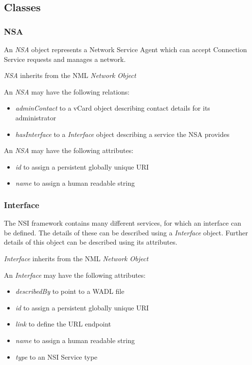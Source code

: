 \documentclass[12pt]{article}  %
\begin{document}
\subsection{Classes}%
\label{sub:classes}

\subsubsection{NSA}%
\label{class:nsa}

An \emph{NSA} object represents a Network Service Agent which can accept Connection Service requests and manages a network.

\emph{NSA} inherits from the NML \emph{Network Object}

An \emph{NSA} may have the following relations:
\begin{itemize}
  \item \emph{adminContact} to a vCard object describing contact details for its administrator
  \item \emph{hasInterface} to a \emph{Interface} object describing a service the NSA provides
\end{itemize}

An \emph{NSA} may have the following attributes:
\begin{itemize}
  \item \emph{id} to assign a persistent globally unique URI
  \item \emph{name} to assign a human readable string  
\end{itemize}

\subsubsection{Interface}%
\label{class:Interface}

The NSI framework contains many different services, for which an interface can be defined. The details of these can be described using a \emph{Interface} object. Further details of this object can be described using its attributes.

\emph{Interface} inherits from the NML \emph{Network Object}

An \emph{Interface} may have the following attributes:
\begin{itemize}
  \item \emph{describedBy} to point to a WADL file
  \item \emph{id} to assign a persistent globally unique URI
  \item \emph{link} to define the URL endpoint
  \item \emph{name} to assign a human readable string  
  \item \emph{type} to an NSI Service type
\end{itemize}
\end{document}
